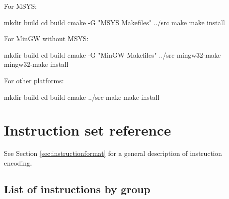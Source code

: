 \documentclass[a4paper,12pt,twoside,extrafontsizes]{memoir}
\begin{document}
For MSYS:

\begin{codepar}
    mkdir build
    cd build
    cmake -G "MSYS Makefiles" ../src
    make
    make install
\end{codepar}

For MinGW without MSYS:

\begin{codepar}
    mkdir build
    cd build
    cmake -G "MinGW Makefiles" ../src
    mingw32-make
    mingw32-make install
\end{codepar}

For other platforms:

\begin{codepar}
    mkdir build
    cd build
    cmake ../src
    make
    make install
\end{codepar}

\appendix

\chapter{Instruction set reference}
\label{app:instructionset}

See Section \ref{sec:instructionformat} for a general description of \lxp{} instruction encoding.

\section{List of instructions by group}
\end{document}
